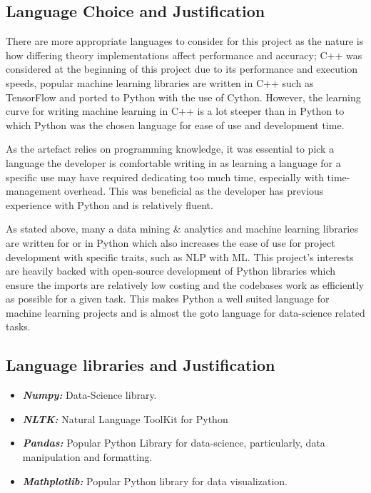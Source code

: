 \subsection{Language Choice and Justification}

There are more appropriate languages to consider for this project as the nature is how differing theory implementations affect performance and accuracy; C++ was considered at the beginning of this project due to its performance and execution speeds, popular machine learning libraries are written in C++ such as TensorFlow and ported to Python with the use of Cython. However, the learning curve for writing machine learning in C++ is a lot steeper than in Python to which Python was the chosen language for ease of use and development time.

As the artefact relies on programming knowledge, it was essential to pick a language the developer is comfortable writing in as learning a language for a specific use may have required dedicating too much time, especially with time-management overhead. This was beneficial as the developer has previous experience with Python and is relatively fluent.

As stated above, many a data mining \& analytics and machine learning libraries are written for or in Python which also increases the ease of use for project development with specific traits, such as NLP with ML. This project's interests are heavily backed with open-source development of Python libraries which ensure the imports are relatively low costing and the codebases work as efficiently as possible for a given task. This makes Python a well suited language for machine learning projects and is almost the goto language for data-science related tasks. \newpage

\subsection{Language libraries and Justification}

\begin{itemize}
    \item \textbf{\textit{Numpy:}} Data-Science library.
    \item \textbf{\textit{NLTK:}} Natural Language ToolKit for Python
    \item \textbf{\textit{Pandas:}} Popular Python Library for data-science, particularly, data manipulation and formatting.
    \item \textbf{\textit{Mathplotlib:}} Popular Python library for data visualization.
\end{itemize}


